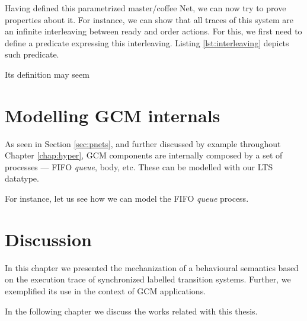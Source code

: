 	\noindent Having defined this parametrized master/coffee \textsf{Net}, we can
	now try to prove properties about it. For instance, we can show that all traces
	of this system are an infinite interleaving between \textsf{ready} and \textsf{order}
	\textsf{actions}. For this, we first need to define a predicate expressing
	this interleaving. Listing \ref{lst:interleaving} depicts such predicate.

					

	\noindent Its definition may seem
	



\section{Modelling GCM internals}
\label{sec:gcmpnets}


	 As seen in Section \ref{sec:pnets}, and further discussed by example throughout Chapter \ref{chap:hyper},
   \ac{GCM} components are internally composed by a set of processes --- \ac{FIFO} \textit{queue}, \textsf{body}, 
   etc. These can be modelled with our \textsf{LTS} datatype.
   
   	For instance, let us see how we can model the \ac{FIFO} \textit{queue} process.  
 	



\section{Discussion}
\label{sec:behaviourdiscussion}

	
	


\chapbreak

	In this chapter we presented the mechanization of a behavioural 
semantics based on the execution trace of synchronized labelled transition systems. Further, we
exemplified its use in the context of \ac{GCM} applications.
	
	In the following chapter we discuss the works related with this thesis.



